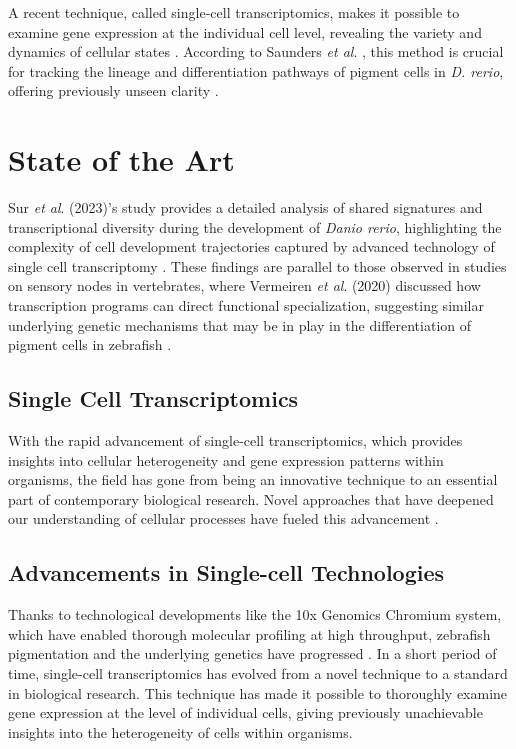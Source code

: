 \documentclass[runningheads]{llncs}
\begin{document}
A recent technique, called single-cell transcriptomics, makes it possible to examine gene expression at the individual cell level, revealing the variety and dynamics of cellular states \cite{nayak2021hitchhiker}. According to Saunders \textit{et al}. \cite{saunders2023embryo}, this method is crucial for tracking the lineage and differentiation pathways of pigment cells in \textit{D. rerio}, offering previously unseen clarity \cite{howard2021atlas}.

\section{State of the Art}
Sur \textit{et al}. (2023)'s study provides a detailed analysis of shared signatures and transcriptional diversity during the development of \textit{Danio rerio}, highlighting the complexity of cell development trajectories captured by advanced technology of single cell transcriptomy \cite{sur2023single}. These findings are parallel to those observed in studies on sensory nodes in vertebrates, where Vermeiren \textit{et al}. (2020) discussed how transcription programs can direct functional specialization, suggesting similar underlying genetic mechanisms that may be in play in the differentiation of pigment cells in zebrafish \cite{vermeiren2020vertebrate}.

\subsection{Single Cell Transcriptomics}
With the rapid advancement of single-cell transcriptomics, which provides insights into cellular heterogeneity and gene expression patterns within organisms, the field has gone from being an innovative technique to an essential part of contemporary biological research. Novel approaches that have deepened our understanding of cellular processes have fueled this advancement \cite{kulkarni2019beyond}.

\subsection{Advancements in Single-cell Technologies}
Thanks to technological developments like the 10x Genomics Chromium system, which have enabled thorough molecular profiling at high throughput, zebrafish pigmentation and the underlying genetics have progressed \cite{srivatsan2020massively}. In a short period of time, single-cell transcriptomics has evolved from a novel technique to a standard in biological research. This technique has made it possible to thoroughly examine gene expression at the level of individual cells, giving previously unachievable insights into the heterogeneity of cells within organisms. 
\end{document}
